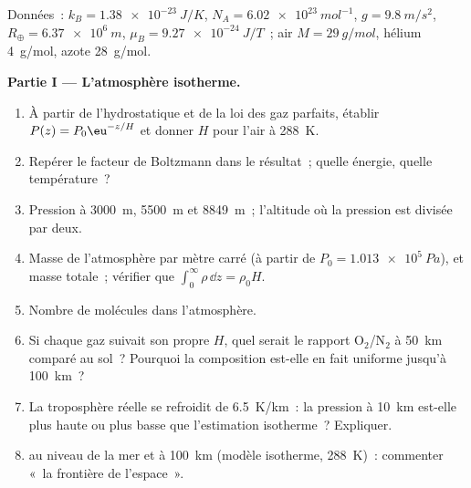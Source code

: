 \begin{problem}\label{pb:b2:boltzmann-factor:1}
Données~: $k_B = \qty{1.38e-23}{J/K}$, $N_A = \qty{6.02e23}{mol^{-1}}$, $g =
\qty{9.8}{m/s^2}$, $R_{\oplus} = \qty{6.37e6}{m}$, $\mu_B = \qty{9.27e-24}{J/T}$~;
air $M = \qty{29}{g/mol}$, hélium \qty{4}{g/mol}, azote \qty{28}{g/mol}.

\textbf{Partie I --- L'atmosphère isotherme.}
\begin{enumerate}
  \item À partir de l'hydrostatique et de la loi des gaz parfaits, établir $P(z) =
        P_0\eu^{-z/H}$ et donner $H$ pour l'air à \qty{288}{K}.
  \item Repérer le facteur de Boltzmann dans le résultat~; quelle énergie,
        quelle température~?
  \item Pression à \qty{3000}{m}, \qty{5500}{m} et \qty{8849}{m}~;
        l'altitude où la pression est divisée par deux.
  \item Masse de l'atmosphère par mètre carré (à partir de $P_0 =
        \qty{1.013e5}{Pa}$), et masse totale~; vérifier que $\int_0^\infty
        \rho\,\dd z = \rho_0H$.
  \item Nombre de molécules dans l'atmosphère.
  \item Si chaque gaz suivait son propre $H$, quel serait le rapport
        O$_2$/N$_2$ à \qty{50}{km} comparé au sol~? Pourquoi la
        composition est-elle en fait uniforme jusqu'à \qty{100}{km}~?
  \item La troposphère réelle se refroidit de \qty{6.5}{K/km}~: la pression
        à \qty{10}{km} est-elle plus haute ou plus basse que l'estimation isotherme~?
        Expliquer.
  \item {} au niveau de la mer et à \qty{100}{km} (modèle
        isotherme, \qty{288}{K})~: commenter «~la frontière de l'espace~».
\end{enumerate}


\end{problem}
